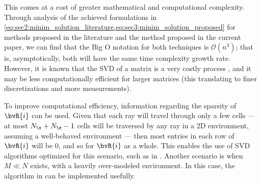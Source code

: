 This comes at a cost of greater mathematical and computational complexity. Through analysis of the achieved formulations in \cref{eq:sec2:minim_solution_literature,eq:sec3:minim_solution_proposed} for methods proposed in the literature and the method proposed in the current paper, we can find that the Big O notation \cite{mala_bigo_2022} for both techniques is $\mathcal{O}(n^3)$; that is, asymptotically, both will have the same time complexity growth rate. However, it is known that the SVD of a matrix is a very costly process \cite{li_tutorial_2019}, and it may be less computationally efficient for larger matrices (this translating to finer discretizations and more measurements).

To improve computational efficiency, information regarding the sparsity of $\bvR{i}$ can be used. Given that each ray will travel through only a few cells --- at most $N_{\x} + N_{\z} - 1$ cells will be traversed by any ray in a 2D environment, assuming a well-behaved environment --- then most entries in each row of $\bvR{i}$ will be $0$, and so for $\bvR{i}$ as a whole. This enables the use of SVD algorithms optimized for this scenario, such as in \cite{sairabanu_parallel_2015}. Another scenario is when $M \ll N$ exists, with a heavily over-modeled environment. In this case, the algorithm in \cite{vasudevan_hierarchical_2019} can be implemented usefully.
